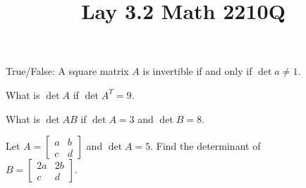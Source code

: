 \documentclass{ximera}
\begin{document}
  	\title{Lay 3.2  \hfill Math 2210Q} 

  \begin{question} True/False: A square matrix $A$ is invertible if and only if $\det a \neq 1$.\\
  	
  	\begin{multipleChoice}
  		\end{multipleChoice}
  	
  	\end{question}	
   \begin{question} What is $\det A$ if $\det A^T = 9$.\\
   	
   	
   \end{question}	
   \begin{question} What is $\det AB$ if $\det A = 3$ and $\det B = 8$.\\
   	
   	
   \end{question}	
   
   \begin{question} Let $A = \begin{bmatrix} a & b\\ c&d\end{bmatrix}$ and $\det A = 5$. Find the determinant of \\ $B = \begin{bmatrix} 2a & 2b\\ c&d\end{bmatrix}$.\\
   	
   	
   \end{question}	
   
\end{document}
